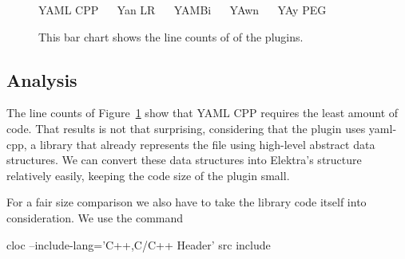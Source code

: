 \begin{figure}[H]
  \begin{bchart}[max=2100, width=0.75\textwidth, unit={~Lines of Code}]




  \end{bchart}
  \begin{center}
  \vspace{-0.5cm}
     YAML CPP ~~
     Yan LR ~~
     YAMBi ~~
     YAwn ~~
     YAy PEG
  \vspace{-0.5cm}
  \end{center}
  \caption{This bar chart shows the line counts of of the  plugins.}
  \label{fig:line_count}
\end{figure}

\subsection{Analysis}

The line counts of Figure~\ref{fig:line_count} show that YAML CPP requires the least amount of code. That results is not that surprising, considering that the plugin uses yaml-cpp, a library that already represents the  file using high-level abstract data structures. We can convert these data structures into Elektra’s  structure relatively easily, keeping the code size of the plugin small.

For a fair size comparison we also have to take the library code itself into consideration. We use the command

\begin{shellcode}
  cloc --include-lang='C++,C/C++ Header' src include
\end{shellcode}

